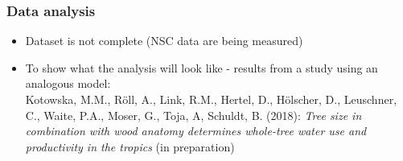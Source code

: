 \documentclass[usepdftitle=false]{beamer}
\newcommand{\blue}[1]{{\color{blue!50!black}#1}}
\begin{document}
\begin{frame}
	\frametitle{Data analysis}
	\begin{itemize}
		\item Dataset is not complete (NSC data are being measured)
		\item<2-> To show what the analysis will look like - results from a study using an analogous model:\\
		
		\vspace{1em} \blue{Kotowska, M.M., Röll, A., \alert{Link, R.M.,} Hertel, D., Hölscher, D., Leuschner, C., Waite, P.A., Moser, G., Toja, A, Schuldt, B. (2018):} \textit{Tree size in combination with wood anatomy determines whole-tree water use and productivity in the tropics} (in preparation)		
		
	\end{itemize}
\end{frame}
\end{document}

